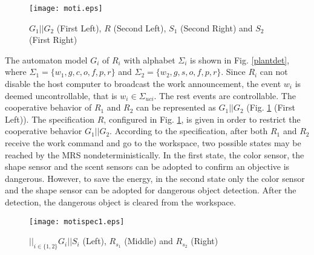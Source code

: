 \documentclass[preprint,authoryear,12pt]{elsarticle}
\begin{document}
\begin{figure}[!htb]
\begin{center}
\texttt{[image: moti.eps]}
\caption{$G_1||G_2$ (First Left), $R$ (Second Left), $S_1$ (Second
Right) and $S_2$ (First Right)} \label{spec}
\end{center}
\end{figure}



The automaton model $G_i$ of $R_i$ with alphabet $\Sigma_{i}$ is
shown in Fig. \ref{plantdet}, where $\Sigma_1=\{w_1, g, c, o, f,
p, r\}$ and $\Sigma_2=\{w_2, g, s, o, f, p, r\}$. Since $R_i$ can
not disable the host computer to broadcast the work announcement,
the event $w_i$ is deemed uncontrollable, that is $w_i \in
\Sigma_{uci}$. The rest events are controllable. The cooperative
behavior of $R_1$ and $R_2$ can be represented as $G_1||G_2$ (Fig.
\ref{spec} (First Left)). The specification $R$, configured in
Fig. \ref{spec}, is given in order to restrict the cooperative
behavior $G_1||G_2$. According to the specification, after both
$R_1$ and $R_2$ receive the work command and go to the workspace,
two possible states may be reached by the MRS
nondeterministically. In the first state, the color sensor, the
shape sensor and the scent sensors can be adopted to confirm an
objective is dangerous. However, to save the energy, in the second
state only the color sensor and the shape sensor can be adopted
for dangerous object detection. After the detection, the dangerous
object is cleared from the workspace.





\begin{figure}[!htb]
\begin{center}
\texttt{[image: motispec1.eps]}
\caption{$||_{i \in \{1, 2\}} G_i||S_i$ (Left), $R_{s_1}$ (Middle)
and $R_{s_2}$ (Right)} \label{proj}
\end{center}
\end{figure}
\end{document}
